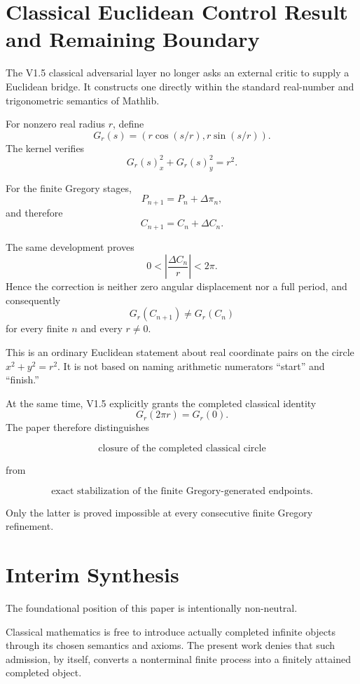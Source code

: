 \documentclass[11pt,a4paper]{article}
\begin{document}
\section{Classical Euclidean Control Result and Remaining Boundary}
\label{sec:classical-euclidean-control}

The V1.5 classical adversarial layer no longer asks an external critic
to supply a Euclidean bridge.  It constructs one directly within the
standard real-number and trigonometric semantics of Mathlib.

For nonzero real radius \(r\), define
\[
G_r(s)
=
\left(
r\cos(s/r),
r\sin(s/r)
\right).
\]
The kernel verifies
\[
G_r(s)_x^2+G_r(s)_y^2=r^2.
\]

For the finite Gregory stages,
\[
P_{n+1}
=
P_n
+
\Delta\pi_n,
\]
and therefore
\[
C_{n+1}
=
C_n
+
\Delta C_n.
\]

The same development proves
\[
0<
\left|
\frac{\Delta C_n}{r}
\right|
<
2\pi.
\]
Hence the correction is neither zero angular displacement nor a full
period, and consequently
\[
\boxed{
G_r(C_{n+1})
\neq
G_r(C_n)
}
\]
for every finite \(n\) and every \(r\neq0\).

This is an ordinary Euclidean statement about real coordinate pairs on
the circle \(x^2+y^2=r^2\).  It is not based on naming arithmetic
numerators ``start'' and ``finish.''

At the same time, V1.5 explicitly grants the completed classical
identity
\[
G_r(2\pi r)=G_r(0).
\]
The paper therefore distinguishes

\[
\text{closure of the completed classical circle}
\]

from

\[
\text{exact stabilization of the finite Gregory-generated endpoints}.
\]

Only the latter is proved impossible at every consecutive finite
Gregory refinement.


\section{Interim Synthesis}

The foundational position of this paper is intentionally non-neutral.

Classical mathematics is free to introduce actually completed
infinite objects through its chosen semantics and axioms. The present
work denies that such admission, by itself, converts a nonterminal
finite process into a finitely attained completed object.
\end{document}
